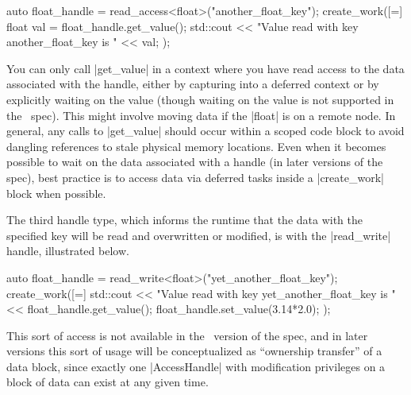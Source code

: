 \begin{CppCode}
auto float_handle = read_access<float>("another_float_key");
create_work([=]{
  float val = float_handle.get_value();
  std::cout << "Value read with key another_float_key is " << val;  
});
\end{CppCode}
You can only call |get_value| in a context where you have read access
to the data associated with the handle, either by capturing into a deferred
context or by explicitly waiting on the value (though waiting on the value is
not supported in the \specVersion\ spec).
This might involve moving data if the |float| is on a remote node.
In general, any calls to |get_value| should occur 
within a scoped code block to avoid dangling references to stale physical memory locations.
Even when it becomes possible to wait on the data associated with a handle (in
later versions of the spec), best practice is to access data via deferred tasks
inside a |create_work| block when possible.

The third handle type, which informs the runtime that the data 
with the specified key will be read and overwritten or modified, 
is with the |read_write| handle, illustrated below. 
\begin{CppCode}
auto float_handle = read_write<float>("yet_another_float_key");
create_work([=] {
  std::cout << "Value read with key yet_another_float_key is " 
          << float_handle.get_value();
  float_handle.set_value(3.14*2.0);
});
\end{CppCode}
This sort of access is not available in the \specVersion\ version of the spec, and in
later versions this sort of usage will be conceptualized as ``ownership
transfer'' of a data block, since exactly one |AccessHandle| with
modification privileges on a block of data can exist at any given time.


